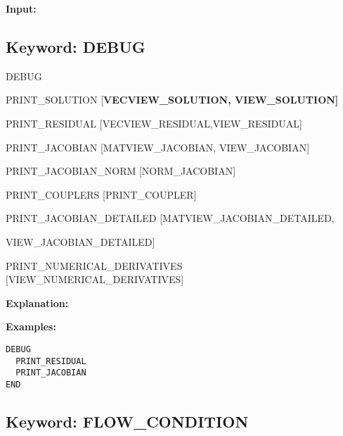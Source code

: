 
\newpage
\protect\hypertarget{target_dbg}{}

{\noindent\bf Input:}

\subsection{Keyword: DEBUG}
\begin{deflist}{00}
\item[DEBUG]~
\begin{deflist}{00}
\item[PRINT\_SOLUTION] [\bf VECVIEW\_SOLUTION, VIEW\_SOLUTION]
\item[PRINT\_RESIDUAL] [VECVIEW\_RESIDUAL,VIEW\_RESIDUAL]
\item[PRINT\_JACOBIAN] [MATVIEW\_JACOBIAN, VIEW\_JACOBIAN]
\item[PRINT\_JACOBIAN\_NORM] [NORM\_JACOBIAN]
\item[PRINT\_COUPLERS] [PRINT\_COUPLER]
\item[PRINT\_JACOBIAN\_DETAILED] [MATVIEW\_JACOBIAN\_DETAILED, 

VIEW\_JACOBIAN\_DETAILED]

\item[PRINT\_NUMERICAL\_DERIVATIVES] [VIEW\_NUMERICAL\_DERIVATIVES]

\end{deflist}
\item[\keyend]
\end{deflist}

{\noindent\bf Explanation:}

\bigskip

\begin{mdframed}

{\noindent\bf Examples:}
\begin{verbatim}
DEBUG
  PRINT_RESIDUAL
  PRINT_JACOBIAN
END
\end{verbatim}
\end{mdframed}

\hyperlink{target_key}{\return}


\newpage
\protect\hypertarget{target_flow_cond}{}

\subsection{Keyword: FLOW\_CONDITION}

